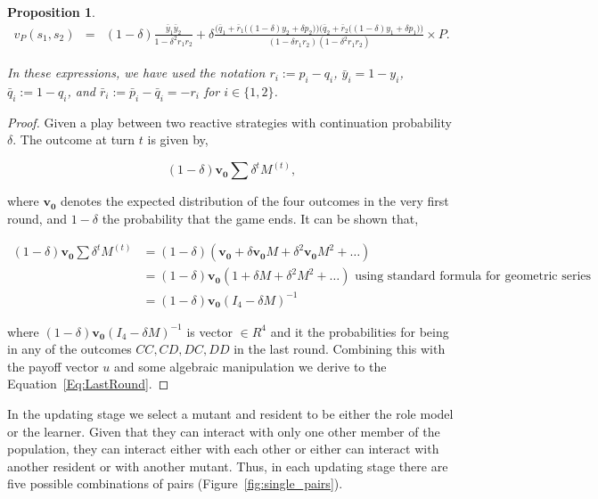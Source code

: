 \documentclass[11pt]{article}
\theoremstyle{plainCl1}
\newtheorem{Prop}{Proposition}
\theoremstyle{plainCl2}
\begin{document}
\begin{Prop}
\begin{equation}
\begin{array}{rcl}
      v_{P}(s_1,s_2) &= &\displaystyle (1\!-\!\delta)\frac{\bar{y}_1\bar{y}_2}{1\!-\!\delta^2 r_1 r_2}+\delta \frac{\Big(\bar{q}_1+\bar{r}_1\big((1\!-\!\delta)y_2+\delta p_2\big)\Big) \Big(\bar{q}_2+\bar{r}_2\big((1\!-\!\delta)y_1+\delta p_1\big)\Big)}
      {\displaystyle(1\!-\!\delta r_1r_2)(1\!-\!\delta^2 r_1 r_2)} \times P.
      \end{array}
    \end{equation}

In these expressions, we have used the notation $r_i:=p_i\!-\!q_i$,
$\bar{y}_i\!=\!1\!-\!y_i$, $\bar{q}_i:=1\!-\!q_i$, and
$\bar{r}_i:=\bar{p}_i\!-\!\bar{q}_i=-r_i$ for $i\!\in\!\{1,2\}$.
\end{Prop}

\begin{proof}
Given a play between two reactive strategies with continuation probability
$\delta$. The outcome at turn \(t\) is given by,

\begin{equation}\label{eq:}
  (1 - \delta) \mathbf{v_0} \sum \delta^{t} M^{(t)},
\end{equation}

where $\mathbf{v_0}$ denotes the expected distribution of the four outcomes in
the very first round, and \(1- \delta\) the probability that the game ends.
It can be shown that,

\begin{align*}
  (1 - \delta) \mathbf{v_0} \sum \delta^{t} M^{(t)} & = (1 - \delta)(\mathbf{v_0} + \delta \mathbf{v_0} M + \delta^{2}\mathbf{v_0} M ^{2} + \dots )\\ 
   & = (1 - \delta)\mathbf{v_0} (1 + \delta M + \delta^{2}M ^{2} + \dots ) \text{ using standard formula for geometric series}\\ 
   & = (1 - \delta)\mathbf{v_0}(I_4 - \delta M)^{-1}
\end{align*}

where \((1 - \delta)\mathbf{v_0}(I_4 - \delta M)^{-1}\) is vector \(\in R^{4}\)
and it the probabilities for being in any of the outcomes \(CC, CD, DC, DD\) in
the last round. Combining this with the payoff vector \(u\) and some algebraic
manipulation we derive to the Equation~\ref{Eq:LastRound}.
\end{proof}

In the updating stage we select a mutant and resident to be either the role
model or the learner. Given that they can interact with only one other member of
the population, they can interact either with each other or either can interact
with another resident or with another mutant. Thus, in each updating stage there
are five possible combinations of pairs (Figure~\ref{fig:single_pairs}).
\end{document}
